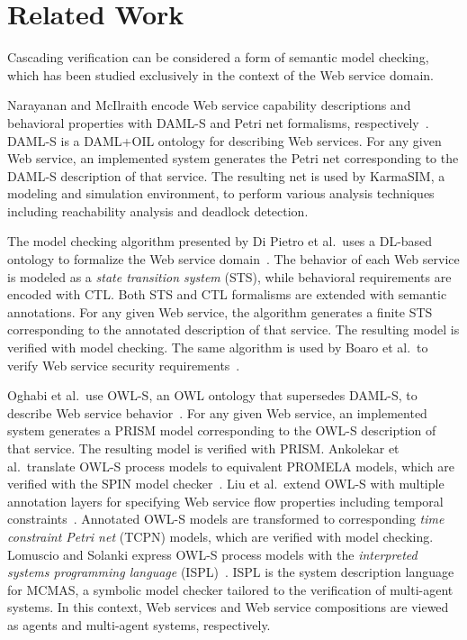 \section{Related Work}
\label{sec:Related_Work}

\noindent Cascading verification can be considered a form of semantic model checking, which has been studied exclusively in the context of the Web service domain.

Narayanan and McIlraith encode Web service capability descriptions and behavioral properties with DAML-S and Petri net formalisms, respectively~\cite{Narayanan_2002}. DAML-S is a DA\-ML+OIL ontology for describing Web services. For any given Web service, an implemented system generates the Petri net corresponding to the DAML-S description of that service. The resulting net is used by KarmaSIM, a modeling and simulation environment, to perform various analysis techniques including reachability analysis and deadlock detection.

The model checking algorithm presented by Di Pietro et al.\ uses a DL-based ontology to formalize the Web service domain~\cite{Di_Pietro_2012}. The behavior of each Web service is modeled as a \emph{state transition system} (STS), while behavioral requirements are encoded with CTL\@. Both STS and CTL formalisms are extended with semantic annotations. For any given Web service, the algorithm generates a finite STS corresponding to the annotated description of that service. The resulting model is verified with model checking. The same algorithm is used by Boaro et al.\ to verify Web service security requirements~\cite{Boaro_2010}.

Oghabi et al.\ use OWL-S, an OWL ontology that supersedes DAML-S, to describe Web service behavior~\cite{Oghabi_2011}. For any given Web service, an implemented system generates a PRISM model corresponding to the OWL-S description of that service. The resulting model is verified with PRISM\@. Ankolekar et al.\ translate OWL-S process models to equivalent PROMELA models, which are verified with the SPIN model checker~\cite{Ankolekar_2005}. Liu et al.\ extend OWL-S with multiple annotation layers for specifying Web service flow properties including temporal constraints~\cite{Liu_2008}. Annotated OWL-S models are transformed to corresponding \emph{time constraint Petri net} (TCPN) models, which are verified with model checking. Lomuscio and Solanki express OWL-S process models with the \emph{interpreted systems programming language} (ISPL)~\cite{Lomuscio_2009}. ISPL is the system description language for MCMAS, a symbolic model checker tailored to the verification of multi-agent systems. In this context, Web services and Web service compositions are viewed as agents and multi-agent systems, respectively.

